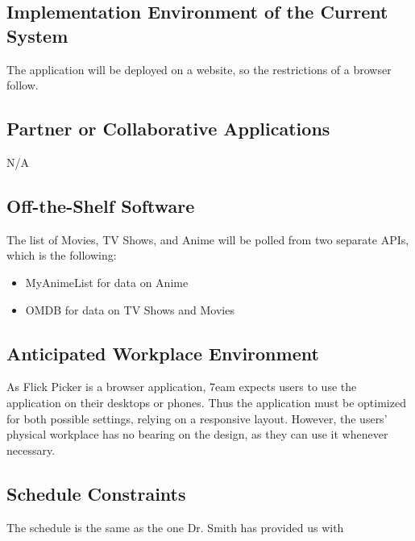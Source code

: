 \documentclass[12pt]{article}
\begin{document}
\subsection{Implementation Environment of the Current System}
The application will be deployed on a website, so the restrictions of a browser follow.

\subsection{Partner or Collaborative Applications}
N/A

\subsection{Off-the-Shelf Software}
The list of Movies, TV Shows, and Anime will be polled from two separate APIs, which is the following:
\begin{itemize}
	\item MyAnimeList for data on Anime
	\item OMDB for data on TV Shows and Movies
\end{itemize}

\subsection{Anticipated Workplace Environment}
As Flick Picker is a browser application, 7eam expects users to use the application on their desktops or phones. Thus the application must be optimized for both possible settings, relying on a responsive layout. However, the users' physical workplace has no bearing on the design, as they can use it whenever necessary. 

\subsection{Schedule Constraints}
The schedule is the same as the one Dr. Smith has provided us with
\end{document}
